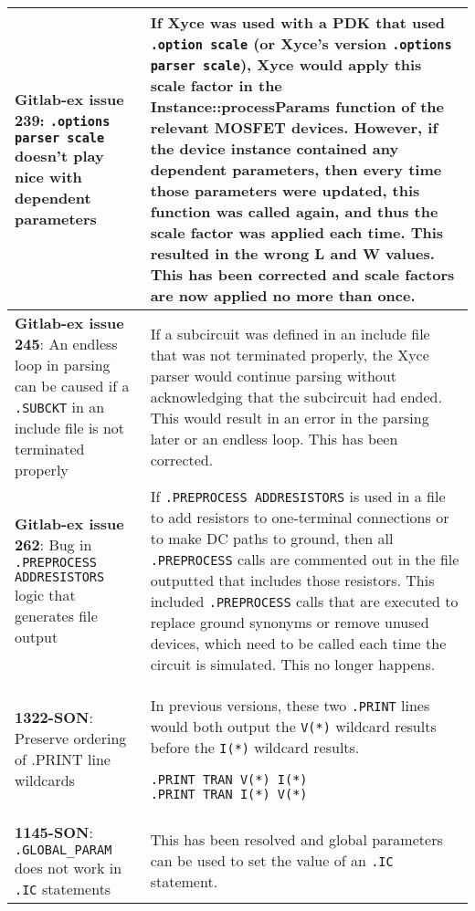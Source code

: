 {\begin{longtable}[h] {>{\raggedright\small}m{2in}|>{\raggedright\let\\\tabularnewline\small}m{3.5in}}
  \textbf{Gitlab-ex issue 239}: \texttt{.options parser scale} doesn't
play nice with dependent parameters & If Xyce was used with a PDK that
used \texttt{.option scale} (or Xyce's version \texttt{.options parser
scale}), Xyce would apply this scale factor in the
Instance::processParams function of the relevant MOSFET devices.
However, if the device instance contained any dependent parameters,
then every time those parameters were updated, this function was
called again, and thus the scale factor was applied each time. This
resulted in the wrong L and W values.  This has been corrected and
scale factors are now applied no more than once.  \\ \hline

  \textbf{Gitlab-ex issue 245}: An endless loop in parsing can be caused 
if a \texttt{.SUBCKT} in an include file is not terminated properly &
If a subcircuit was defined in an include file that was not terminated
properly, the Xyce parser would continue parsing without acknowledging
that the subcircuit had ended.  This would result in an error in the
parsing later or an endless loop.  This has been corrected. \\ \hline
 
  \textbf{Gitlab-ex issue 262}: Bug in \texttt{.PREPROCESS ADDRESISTORS} 
logic that generates file output & If \texttt{.PREPROCESS ADDRESISTORS}
is used in a file to add resistors to one-terminal connections or to
make DC paths to ground, then all \texttt{.PREPROCESS} calls are 
commented out in the file outputted that includes those resistors.
This included \texttt{.PREPROCESS} calls that are executed to replace
ground synonyms or remove unused devices, which need to be called each
time the circuit is simulated.  This no longer happens. \\ \hline

  \textbf{1322-SON}: Preserve ordering of .PRINT line wildcards &
In previous \Xyce{} versions, these two \texttt{.PRINT} lines would
both output the \texttt{V(*)} wildcard results before the \texttt{I(*)}
wildcard results.
\begin{verbatim}
.PRINT TRAN V(*) I(*)
.PRINT TRAN I(*) V(*)
\end{verbatim}
\\ \hline

  \textbf{1145-SON}: \texttt{.GLOBAL\_PARAM} does not work
in \texttt{.IC} statements & This has been resolved and global
parameters can be used to set the value of an \texttt{.IC}
statement.\\ \hline


\end{longtable}}
